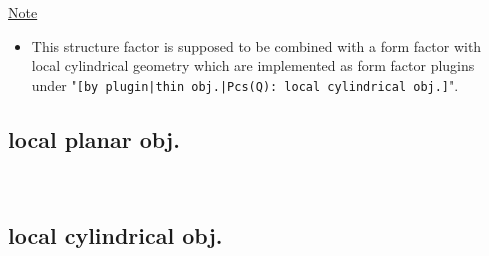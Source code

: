 \noindent
\underline{Note}
\begin{itemize}
  \item This structure factor is supposed to be combined with a form factor with local cylindrical geometry which are implemented as form factor plugins
under "\texttt{[by plugin|thin obj.|Pcs(Q): local cylindrical obj.]}".
\end{itemize}

\clearpage
\subsection{local planar  obj.} ~\\
\label{plugin:LocalPlanar)}

\subsection{local cylindrical obj.} ~\\
\label{plugin:LocalCylindrical)}
